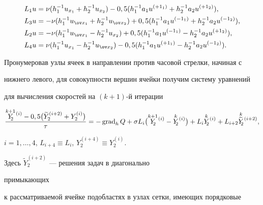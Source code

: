 \begin{align*}


L_1u&=\nu(h_1^{-1}u_{x_1}+h_2^{-1}u_{x_2})-


0,5(h_1^{-1}a_1u^{(+1_1)}+h_2^{-1}a_2u^{(+1_2)}),\\


%


L_3u&=-\nu(h_1^{-1}u_{\ov x_1}+h_2^{-1}u_{\ov x_2})+


0,5(h_1^{-1}a_1u^{(-1_1)}+h_2^{-1}a_2u^{(-1_2)}),\\


%


L_2u&=-\nu(h_1^{-1}u_{\ov x_1}-h_2^{-1}u_{x_2})+


0,5(h_1^{-1}a_1u^{(-1_1)}-h_2^{-1}a_2u^{(+1_2)}),\\


%


L_4u&=\nu(h_1^{-1}u_{x_1}-h_2^{-1}u_{\ov x_2})-


0,5(h_1^{-1}a_1u^{(+1_1)}-h_2^{-1}a_2u^{(-1_2)}).


\end{align*}


Пронумеровав узлы ячеек в направлении против часовой стрелки, начиная с


нижнего левого, для совокупности вершин ячейки получим систему уравнений


для вычисления скоростей на $(k+1)$-й итерации


\begin{equation}


\frac{\overset{k+1}{Y}{\!}_{\!\!\!\!2}^{\;(i)}-


0,5\big(\widetilde Y_2^{(i+2)}+Y_2^{(i)}\big)}{\tau}=


-\Grad_hQ+\sigma L_i\big(\overset{k+1}{Y}{\!}_{\!\!\!\!2}^{\;(i)}-


\overset{k}{Y}{\!}_{\!\!2}^{\;(i)}\big)+


L_i\overset{k}{Y}{\!}_{\!\!2}^{\;(i)}+L_{i+2}


\overset{k}{\widetilde Y}{\!}_{\!\!2}^{\;(i+2)},


\end{equation}


$i=1,\dotsc,4$, $L_{i+4}\equiv L_i$, $Y_2^{(i+4)}\equiv Y_2^{(i)}$.


Здесь $\widetilde Y_2^{(i+2)}$ --- решения задач в диагонально


примыкающих


к рассматриваемой ячейке подобластях в узлах сетки, имеющих порядковые


